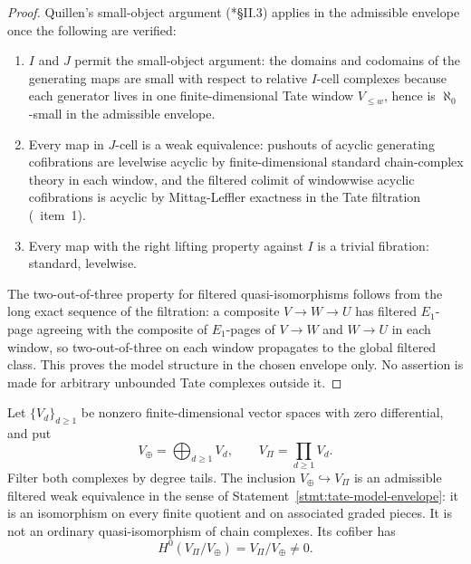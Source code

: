 \begin{proof}
  Quillen's small-object argument (\cite{quillen-htpy}*{\S II.3})
  applies in the admissible envelope once the following are
  verified:
  \begin{enumerate}[label=(\roman*)]
    \item $I$ and $J$ permit the small-object argument:
      the domains and codomains of the generating maps are small
      with respect to relative $I$-cell complexes because each
      generator lives in one finite-dimensional Tate window
      $V_{\leq w}$, hence is $\aleph_0$-small in the admissible
      envelope.
    \item Every map in $J$-cell is a weak equivalence: pushouts of
      acyclic generating cofibrations are levelwise acyclic by
      finite-dimensional standard chain-complex theory in each
      window, and the filtered colimit of windowwise acyclic
      cofibrations is acyclic by Mittag-Leffler exactness in the
      Tate filtration (\alpharef\ item~1).
    \item Every map with the right lifting property against $I$ is
      a trivial fibration: standard, levelwise.
  \end{enumerate}
  The two-out-of-three property for filtered quasi-isomorphisms
  follows from the long exact sequence of the filtration: a
  composite $V\to W\to U$ has filtered $E_1$-page agreeing with
  the composite of $E_1$-pages of $V\to W$ and $W\to U$ in each
  window, so two-out-of-three on each window propagates to the
  global filtered class. This proves the model structure in the
  chosen envelope only. No assertion is made for arbitrary unbounded
  Tate complexes outside it.
\end{proof}

\begin{lem}
\label{lem:tate-envelope-tail-boundary}
  Let \(\{V_d\}_{d\geq1}\) be nonzero finite-dimensional vector
  spaces with zero differential, and put
  \[
    V_{\oplus}=\bigoplus_{d\geq1}V_d,\qquad
    V_{\Pi}=\prod_{d\geq1}V_d .
  \]
  Filter both complexes by degree tails.  The inclusion
  \(V_{\oplus}\hookrightarrow V_{\Pi}\) is an admissible filtered weak
  equivalence in the sense of
  Statement~\ref{stmt:tate-model-envelope}: it is an isomorphism on
  every finite quotient and on associated graded pieces.  It is not an
  ordinary quasi-isomorphism of chain complexes.  Its cofiber has
  \[
    H^0(V_{\Pi}/V_{\oplus})=V_{\Pi}/V_{\oplus}\neq0 .
  \]
\end{lem}

